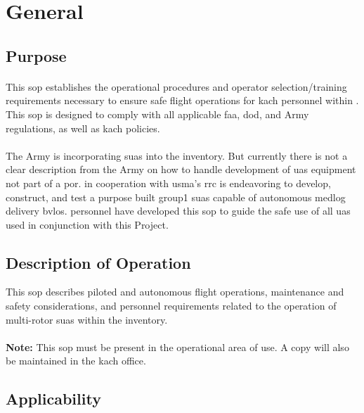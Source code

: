 \chapter{General}
\label{ch:general}

\section{Purpose}
        \subsubsection{} This \ac{sop} establishes the operational procedures and operator selection/training requirements necessary to ensure safe flight operations for \ac{kach} personnel within \projectmars{}. This \ac{sop} is designed to comply with all applicable \ac{faa}, \ac{dod}, and Army regulations, as well as \ac{kach} policies.

        \subsubsection{} The Army is incorporating \ac{suas} into the  inventory.  But currently there is not a clear description from the Army on how to handle development of \ac{uas} equipment not part of a \ac{por}.  \projectmars{} in cooperation with \ac{usma}'s \ac{rrc} is endeavoring to develop, construct, and test a purpose built \gls{group1} \ac{suas} capable of autonomous \ac{medlog} delivery \ac{bvlos}.  \projectmars{} personnel have developed this \ac{sop} to guide the safe use of all \ac{uas} used in conjunction with this Project.

\section{Description of Operation}
        This \ac{sop} describes piloted and autonomous flight operations, maintenance and safety considerations, and personnel requirements related to the operation of multi-rotor \ac{suas} within the \projectmars{} inventory.
\\
\\
\noindent \textbf{Note:} This \ac{sop} must be present in the operational area of use. A copy will also be maintained in the \ac{kach} \projectmars{} office.

\section{Applicability}
